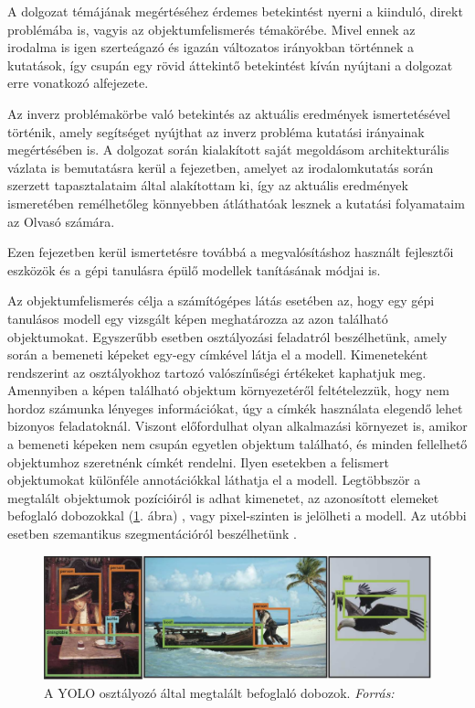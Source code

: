 \label{ch:concept}

A dolgozat témájának megértéséhez érdemes betekintést nyerni a kiinduló, direkt problémába is, vagyis az objektumfelismerés témakörébe. Mivel ennek az irodalma is igen szerteágazó és igazán változatos irányokban történnek a kutatások, így csupán egy rövid áttekintő betekintést kíván nyújtani a dolgozat erre vonatkozó alfejezete.

Az inverz problémakörbe való betekintés az aktuális eredmények ismertetésével történik, amely segítséget nyújthat az inverz probléma kutatási irányainak megértésében is. A dolgozat során kialakított saját megoldásom architekturális vázlata is bemutatásra kerül a fejezetben, amelyet az irodalomkutatás során szerzett tapasztalataim által alakítottam ki, így az aktuális eredmények ismeretében remélhetőleg könnyebben átláthatóak lesznek a kutatási folyamataim az Olvasó számára.

Ezen fejezetben kerül ismertetésre továbbá a megvalósításhoz használt fejlesztői eszközök és a gépi tanulásra épülő modellek tanításának módjai is.


Az objektumfelismerés célja a számítógépes látás esetében az, hogy egy gépi tanulásos modell egy vizsgált képen meghatározza az azon található objektumokat. Egyszerűbb esetben osztályozási feladatról beszélhetünk, amely során a bemeneti képeket egy-egy címkével látja el a modell. Kimeneteként rendszerint az osztályokhoz tartozó valószínűségi értékeket kaphatjuk meg. Amennyiben a képen található objektum környezetéről feltételezzük, hogy nem hordoz számunka lényeges információkat, úgy a címkék használata elegendő lehet bizonyos feladatoknál. Viszont előfordulhat olyan alkalmazási környezet is, amikor a bemeneti képeken nem csupán egyetlen objektum található, és minden fellelhető objektumhoz szeretnénk címkét rendelni. Ilyen esetekben a felismert objektumokat különféle annotációkkal láthatja el a modell. Legtöbbször a megtalált objektumok pozícióiról is adhat kimenetet, az azonosított elemeket befoglaló dobozokkal  (\ref{fig:yolo}. ábra) \cite{redmon2016you}, vagy pixel-szinten is jelölheti a modell. Az utóbbi esetben szemantikus szegmentációról beszélhetünk \cite{long2015fully}.

\begin{figure}[h]
	\centering
	\includegraphics[width=15cm]{images/yolo.png}
	\caption{A YOLO osztályozó által megtalált befoglaló dobozok. \textit{Forrás:} \cite{redmon2016you}}
	\label{fig:yolo}
\end{figure}

